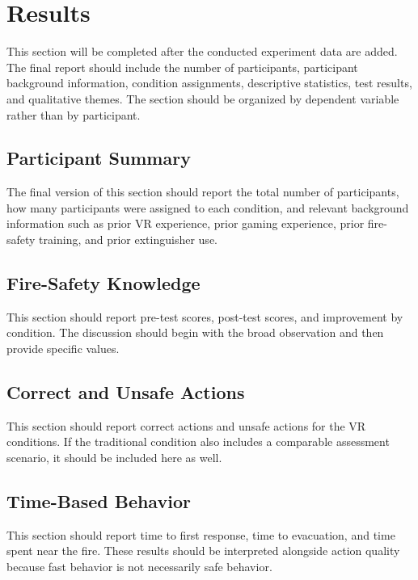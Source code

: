 \documentclass[manuscript, review]{acmart}
\begin{document}
{\section{Results}
\label{sec:results}

This section will be completed after the conducted experiment data are added. The final report should include the number of participants, participant background information, condition assignments, descriptive statistics, test results, and qualitative themes. The section should be organized by dependent variable rather than by participant.

\subsection{Participant Summary}

The final version of this section should report the total number of participants, how many participants were assigned to each condition, and relevant background information such as prior VR experience, prior gaming experience, prior fire-safety training, and prior extinguisher use.

\subsection{Fire-Safety Knowledge}

This section should report pre-test scores, post-test scores, and improvement by condition. The discussion should begin with the broad observation and then provide specific values.

\subsection{Correct and Unsafe Actions}

This section should report correct actions and unsafe actions for the VR conditions. If the traditional condition also includes a comparable assessment scenario, it should be included here as well.

\subsection{Time-Based Behavior}

This section should report time to first response, time to evacuation, and time spent near the fire. These results should be interpreted alongside action quality because fast behavior is not necessarily safe behavior.

}
\end{document}
